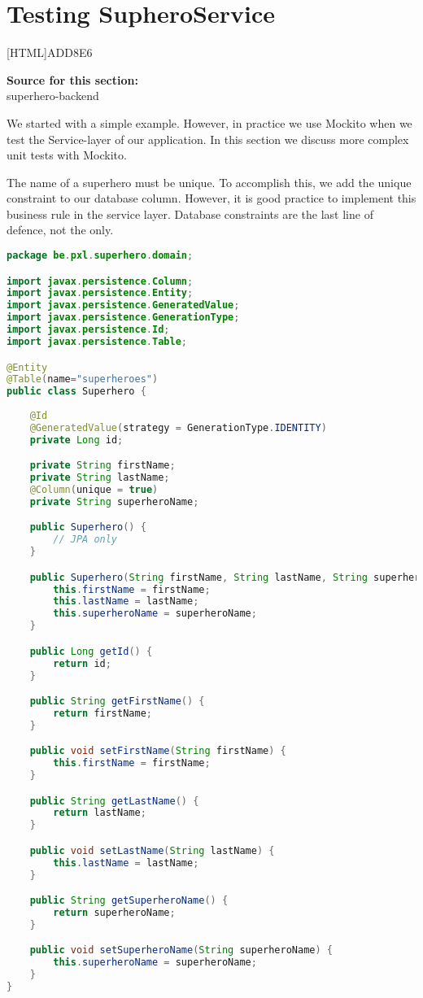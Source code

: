 \section{Testing SupheroService}

[HTML]{ADD8E6}{\parbox{\textwidth}{%
\noindent \textbf{Source for this section:}\\
superhero-backend
}}

We started with a simple example.  However, in practice we use Mockito when we test the Service-layer of our application. In this section we discuss more complex unit tests with Mockito.

The name of a superhero must be unique. To accomplish this, we add the unique constraint to our database column. 
However, it is good practice to implement this business rule in the service layer.
Database constraints are the last line of defence, not the only. 

\begin{lstlisting}[frame=single,language=java]
package be.pxl.superhero.domain;

import javax.persistence.Column;
import javax.persistence.Entity;
import javax.persistence.GeneratedValue;
import javax.persistence.GenerationType;
import javax.persistence.Id;
import javax.persistence.Table;

@Entity
@Table(name="superheroes")
public class Superhero {
	
	@Id
	@GeneratedValue(strategy = GenerationType.IDENTITY)
	private Long id;

	private String firstName;
	private String lastName;
	@Column(unique = true)
	private String superheroName;

	public Superhero() {
		// JPA only
	}

	public Superhero(String firstName, String lastName, String superheroName) {
		this.firstName = firstName;
		this.lastName = lastName;
		this.superheroName = superheroName;
	}

	public Long getId() {
		return id;
	}

	public String getFirstName() {
		return firstName;
	}

	public void setFirstName(String firstName) {
		this.firstName = firstName;
	}

	public String getLastName() {
		return lastName;
	}

	public void setLastName(String lastName) {
		this.lastName = lastName;
	}

	public String getSuperheroName() {
		return superheroName;
	}

	public void setSuperheroName(String superheroName) {
		this.superheroName = superheroName;
	}
}
\end{lstlisting}



